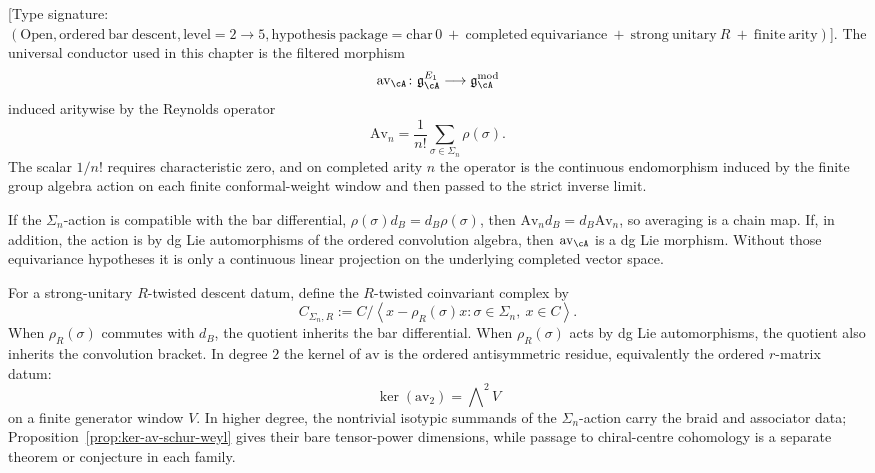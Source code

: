\begin{proposition}
\label{prop:averaging-reynolds-rtwisted-gate}
\textup{[}Type signature:
$(\mathrm{Open},\mathrm{ordered\ bar\ descent},
\mathrm{level}=2\to5,
\mathrm{hypothesis\ package}=\mathrm{char}\,0
\ +\ \mathrm{completed\ equivariance}
\ +\ \mathrm{strong\ unitary}\ R
\ +\ \mathrm{finite\ arity})$\textup{].}
The universal conductor used in this chapter is the filtered morphism
\[
\mathrm{av}_\cA\colon
\mathfrak g^{E_1}_\cA\longrightarrow \mathfrak g^{\mathrm{mod}}_\cA
\]
induced aritywise by the Reynolds operator
\[
\mathrm{Av}_n=\frac1{n!}\sum_{\sigma\in\Sigma_n}\rho(\sigma).
\]
The scalar \(1/n!\) requires characteristic zero, and on completed
arity \(n\) the operator is the continuous endomorphism induced by the
finite group algebra action on each finite conformal-weight window and
then passed to the strict inverse limit.

If the \(\Sigma_n\)-action is compatible with the bar differential,
\(\rho(\sigma)d_B=d_B\rho(\sigma)\), then
\(\mathrm{Av}_n d_B=d_B\mathrm{Av}_n\), so averaging is a chain map.
If, in addition, the action is by dg Lie automorphisms of the ordered
convolution algebra, then \(\mathrm{av}_\cA\) is a dg Lie morphism.
Without those equivariance hypotheses it is only a continuous linear
projection on the underlying completed vector space.

For a strong-unitary \(R\)-twisted descent datum, define the
\(R\)-twisted coinvariant complex by
\[
C_{\Sigma_n,R}
:=
C\Big/
\left\langle x-\rho_R(\sigma)x:\sigma\in\Sigma_n,\ x\in C\right\rangle .
\]
When \(\rho_R(\sigma)\) commutes with \(d_B\), the quotient inherits
the bar differential.  When \(\rho_R(\sigma)\) acts by dg Lie
automorphisms, the quotient also inherits the convolution bracket.
In degree \(2\) the kernel of \(\mathrm{av}\) is the ordered
antisymmetric residue, equivalently the ordered \(r\)-matrix datum:
\[
\ker(\mathrm{av}_2)=\bigwedge\nolimits^2 V
\]
on a finite generator window \(V\).  In higher degree, the nontrivial
isotypic summands of the \(\Sigma_n\)-action carry the braid and
associator data; Proposition~\ref{prop:ker-av-schur-weyl} gives their
bare tensor-power dimensions, while passage to chiral-centre
cohomology is a separate theorem or conjecture in each family.
\end{proposition}

